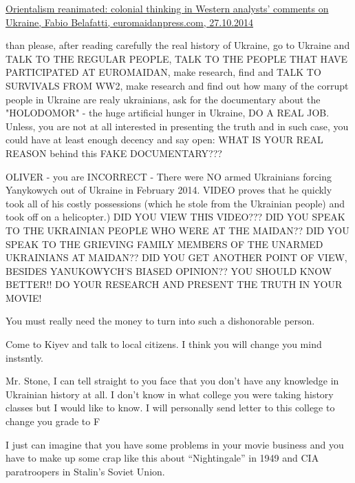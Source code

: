 \begin{itemize}
\href{http://euromaidanpress.com/2014/10/27/western-commentators-should-rid-themselves-of-old-prejudices-dating-back-from-the-age-of-colonialism-before-commenting-on-eastern-european-affairs/}{%
Orientalism reanimated: colonial thinking in Western analysts’ comments on Ukraine, Fabio Belafatti, euromaidanpress.com, 27.10.2014%
}


than please, after reading carefully the real history of Ukraine, go to Ukraine
and TALK TO THE REGULAR PEOPLE, TALK TO THE PEOPLE THAT HAVE PARTICIPATED AT
EUROMAIDAN, make research, find and TALK TO SURVIVALS FROM WW2, make research
and find out how many of the corrupt people in Ukraine are realy ukrainians,
ask for the documentary about the "HOLODOMOR" - the huge artificial hunger in
Ukraine, DO A REAL JOB. Unless, you are not at all interested in presenting the
truth and in such case, you could have at least enough decency and say open:
WHAT IS YOUR REAL REASON behind this FAKE DOCUMENTARY???


OLIVER - you are INCORRECT - There were NO armed Ukrainians forcing Yanykowych
out of Ukraine in February 2014. VIDEO proves that he quickly took all of his
costly possessions (which he stole from the Ukrainian people) and took off on a
helicopter.) DID YOU VIEW THIS VIDEO??? DID YOU SPEAK TO THE UKRAINIAN PEOPLE
WHO WERE AT THE MAIDAN?? DID YOU SPEAK TO THE GRIEVING FAMILY MEMBERS OF THE
UNARMED UKRAINIANS AT MAIDAN?? DID YOU GET ANOTHER POINT OF VIEW, BESIDES
YANUKOWYCH'S BIASED OPINION?? YOU SHOULD KNOW BETTER!! DO YOUR RESEARCH AND
PRESENT THE TRUTH IN YOUR MOVIE!

You must really need the money to turn into such a dishonorable person.

Come to Kiyev and talk to local citizens. I think you will change you mind instsntly.


Mr. Stone, I can tell straight to you face that you don’t have any knowledge in
Ukrainian history at all. I don’t know in what college you were taking history
classes but I would like to know. I will personally send letter to this college
to change you grade to F

I just can imagine that you have some problems in your movie business and you
have to make up some crap like this about “Nightingale” in 1949 and CIA
paratroopers in Stalin’s Soviet Union.


\end{itemize}
